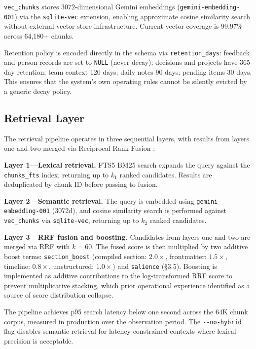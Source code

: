 \documentclass{article}
\begin{document}
\texttt{vec\_chunks} stores 3072-dimensional Gemini embeddings
(\texttt{gemini-embedding-001}) via the \texttt{sqlite-vec} extension, enabling
approximate cosine similarity search without external vector store infrastructure. Current
vector coverage is 99.97\% across 64,180+ chunks.

Retention policy is encoded directly in the schema via \texttt{retention\_days}: feedback
and person records are set to \texttt{NULL} (never decay); decisions and projects have
365-day retention; team context 120 days; daily notes 90 days; pending items 30 days. This
ensures that the system's own operating rules cannot be silently evicted by a generic decay
policy.

\subsection{Retrieval Layer}

The retrieval pipeline operates in three sequential layers, with results from layers one and
two merged via Reciprocal Rank Fusion \cite{cormack2009rrf}:

\textbf{Layer 1---Lexical retrieval.} FTS5 BM25 search expands the query against the
\texttt{chunks\_fts} index, returning up to $k_1$ ranked candidates. Results are
deduplicated by chunk ID before passing to fusion.

\textbf{Layer 2---Semantic retrieval.} The query is embedded using
\texttt{gemini-embedding-001} (3072d), and cosine similarity search is performed against
\texttt{vec\_chunks} via \texttt{sqlite-vec}, returning up to $k_2$ ranked candidates.

\textbf{Layer 3---RRF fusion and boosting.} Candidates from layers one and two are merged
via RRF with $k=60$. The fused score is then multiplied by two additive boost terms:
\texttt{section\_boost} (compiled section: $2.0\times$, frontmatter: $1.5\times$,
timeline: $0.8\times$, unstructured: $1.0\times$) and \texttt{salience} (\S3.5). Boosting
is implemented as additive contributions to the log-transformed RRF score to prevent
multiplicative stacking, which prior operational experience identified as a source of score
distribution collapse.

The pipeline achieves p95 search latency below one second across the 64K chunk corpus,
measured in production over the observation period. The \texttt{-{}-no-hybrid} flag disables
semantic retrieval for latency-constrained contexts where lexical precision is acceptable.
\end{document}
